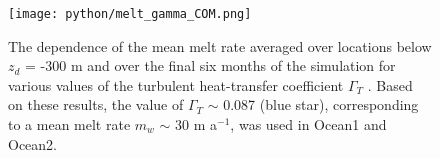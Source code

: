 \documentclass[11pt]{article} %
\begin{document}
\begin{figure}[htbp]
\begin{center}
\texttt{[image: python/melt\_gamma\_COM.png]}
\label{fig1}
\caption{The dependence of the mean melt rate averaged over locations below $z_d$ = -300 m and over the final six months of the simulation for various values of the turbulent heat-transfer coefficient $\Gamma_T$ . Based on these results, the value of $\Gamma_T$ $\sim$ 0.087 (blue star), corresponding to a mean melt rate $m_w$ $\sim$ 30 m a$^{-1}$, was used in Ocean1 and Ocean2.}
\end{center}
\end{figure}






\end{document}
